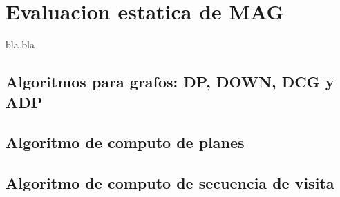 \chapter{Evaluacion estatica de MAG }
\label{chap:eval_est}
\minitoc

bla bla

\section{Algoritmos para grafos: DP, DOWN, DCG y ADP}



\vspace{4cm}





\section{Algoritmo de computo de planes}



\section{Algoritmo de computo de secuencia de visita}

